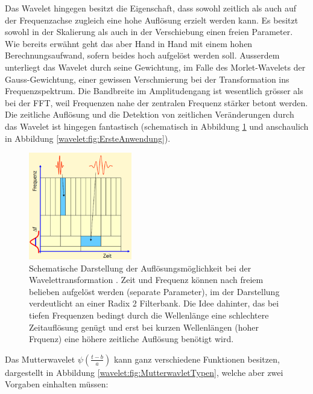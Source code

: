 Das Wavelet hingegen besitzt die Eigenschaft, dass sowohl zeitlich
als auch auf der Frequenzachse zugleich eine hohe Auflösung erzielt
werden kann.
Es besitzt sowohl in der Skalierung als auch in der Verschiebung
einen freien Parameter.
Wie bereits erwähnt geht das aber Hand in Hand mit einem hohen
Berechnungsaufwand, sofern beides hoch aufgelöst werden soll.
Ausserdem unterliegt das Wavelet durch seine Gewichtung, im Falle
des Morlet-Wavelets der Gauss-Gewichtung,
einer gewissen Verschmierung bei der Transformation ins Frequenzspektrum.
Die Bandbreite im Amplitudengang ist wesentlich grösser als bei der
FFT, weil Frequenzen nahe der zentralen Frequenz stärker betont
werden.
Die zeitliche Auflösung und die Detektion von zeitlichen Veränderungen
durch das Wavelet ist hingegen fantastisch (schematisch in Abbildung
\ref{wavelet:fig:CWTAufloesungRadix2} und anschaulich in Abbildung
\ref{wavelet:fig:ErsteAnwendung}).

\begin{figure}
	\centering
	\includegraphics[width=0.4\textwidth]{papers/wavelets/images/6-3_CWTAufloesungRadix2.png}
	\caption{Schematische Darstellung der Auflösungsmöglichkeit
	bei der Wavelettransformation \cite{wavelets:J.Mayer.2002}.
	Zeit und Frequenz können nach freiem belieben aufgelöst
	werden (separate Parameter), im der Darstellung verdeutlicht
	an einer Radix 2 Filterbank. Die Idee dahinter, das bei
	tiefen Frequenzen bedingt durch die Wellenlänge eine
	schlechtere Zeitauflösung genügt und erst bei kurzen
	Wellenlängen (hoher Frquenz) eine höhere zeitliche Auflösung
	benötigt wird.}
	\label{wavelet:fig:CWTAufloesungRadix2}
\end{figure}

Das Mutterwavelet $\psi\left(\frac{t-b}{a}\right)$ kann ganz
verschiedene Funktionen besitzen, dargestellt in Abbildung
\ref{wavelet:fig:MutterwavletTypen}, welche aber zwei Vorgaben
einhalten müssen:

